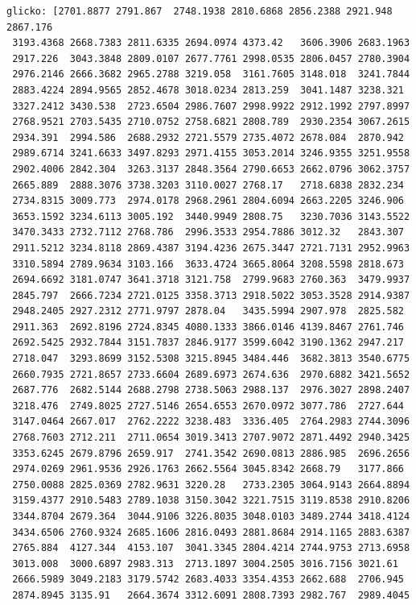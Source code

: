 \documentclass[11pt]{article}
\begin{document}
\begin{Verbatim}[commandchars=\\\{\}]
glicko: [2701.8877 2791.867  2748.1938 2810.6868 2856.2388 2921.948  2867.176
 3193.4368 2668.7383 2811.6335 2694.0974 4373.42   3606.3906 2683.1963
 2917.226  3043.3848 2809.0107 2677.7761 2998.0535 2806.0457 2780.3904
 2976.2146 2666.3682 2965.2788 3219.058  3161.7605 3148.018  3241.7844
 2883.4224 2894.9565 2852.4678 3018.0234 2813.259  3041.1487 3238.321
 3327.2412 3430.538  2723.6504 2986.7607 2998.9922 2912.1992 2797.8997
 2768.9521 2703.5435 2710.0752 2758.6821 2808.789  2930.2354 3067.2615
 2934.391  2994.586  2688.2932 2721.5579 2735.4072 2678.084  2870.942
 2989.6714 3241.6633 3497.8293 2971.4155 3053.2014 3246.9355 3251.9558
 2902.4006 2842.304  3263.3137 2848.3564 2790.6653 2662.0796 3062.3757
 2665.889  2888.3076 3738.3203 3110.0027 2768.17   2718.6838 2832.234
 2734.8315 3009.773  2974.0178 2968.2961 2804.6094 2663.2205 3246.906
 3653.1592 3234.6113 3005.192  3440.9949 2808.75   3230.7036 3143.5522
 3470.3433 2732.7112 2768.786  2996.3533 2954.7886 3012.32   2843.307
 2911.5212 3234.8118 2869.4387 3194.4236 2675.3447 2721.7131 2952.9963
 3310.5894 2789.9634 3103.166  3633.4724 3665.8064 3208.5598 2818.673
 2694.6692 3181.0747 3641.3718 3121.758  2799.9683 2760.363  3479.9937
 2845.797  2666.7234 2721.0125 3358.3713 2918.5022 3053.3528 2914.9387
 2948.2405 2927.2312 2771.9797 2878.04   3435.5994 2907.978  2825.582
 2911.363  2692.8196 2724.8345 4080.1333 3866.0146 4139.8467 2761.746
 2692.5425 2932.7844 3151.7837 2846.9177 3599.6042 3190.1362 2947.217
 2718.047  3293.8699 3152.5308 3215.8945 3484.446  3682.3813 3540.6775
 2660.7935 2721.8657 2733.6604 2689.6973 2674.636  2970.6882 3421.5652
 2687.776  2682.5144 2688.2798 2738.5063 2988.137  2976.3027 2898.2407
 3218.476  2749.8025 2727.5146 2654.6553 2670.0972 3077.786  2727.644
 3147.0464 2667.017  2762.2222 3238.483  3336.405  2764.2983 2744.3096
 2768.7603 2712.211  2711.0654 3019.3413 2707.9072 2871.4492 2940.3425
 3353.6245 2679.8796 2659.917  2741.3542 2690.0813 2886.985  2696.2656
 2974.0269 2961.9536 2926.1763 2662.5564 3045.8342 2668.79   3177.866
 2750.0088 2825.0369 2782.9631 3220.28   2733.2305 3064.9143 2664.8894
 3159.4377 2910.5483 2789.1038 3150.3042 3221.7515 3119.8538 2910.8206
 3344.8704 2679.364  3044.9106 3226.8035 3048.0103 3489.2744 3418.4124
 3434.6506 2760.9324 2685.1606 2816.0493 2881.8684 2914.1165 2883.6387
 2765.884  4127.344  4153.107  3041.3345 2804.4214 2744.9753 2713.6958
 3013.008  3000.6897 2983.313  2713.1897 3004.2505 3016.7156 3021.61
 2666.5989 3049.2183 3179.5742 2683.4033 3354.4353 2662.688  2706.945
 2874.8945 3135.91   2664.3674 3312.6091 2808.7393 2982.767  2989.4045

\end{Verbatim}
\end{document}
